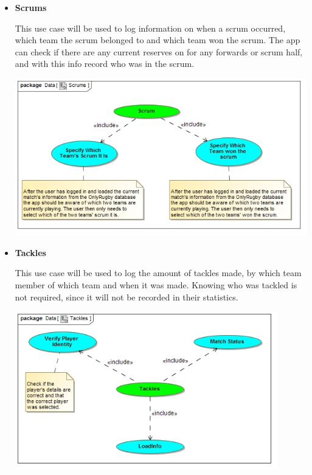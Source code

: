 \documentclass[a4paper,12pt]{report}
\begin{document}
\begin{itemize}
\begin{center}
		\end{center}
\newpage
	\item \textbf{Scrums}
		\begin{flushleft}
		This use case will be used to log information on when a scrum occurred, which team the scrum belonged to and which team won the scrum. The app can check if there are any current reserves on for any forwards or scrum half, and with this info record who was in the scrum.
		\end{flushleft}
		\begin{center}
		\includegraphics[width=1\textwidth]{./Diagrams/Scrums.jpg}\\[0.4cm]
		\end{center}
	\item \textbf{Tackles}
		\begin{flushleft}
			This use case will be used to log the amount of tackles made, by which team member of which team and when it was made. Knowing who was tackled is not required, since it will not be recorded in their statistics.
		\end{flushleft}
		\begin{center}
		\includegraphics[width=0.9\textwidth]{./Diagrams/Tackles.jpg}\\[0.4cm]

\end{center}
\end{itemize}
\end{document}
